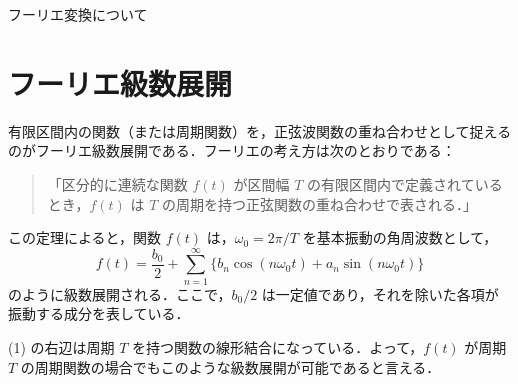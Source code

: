 \documentclass[a4paper,10pt]{article}
\begin{document}
\setcounter{page}{2}
\begin{center}{\LARGE\sffamily フーリエ変換について}\end{center}
\vspace{9pt}
\section{フーリエ級数展開}
有限区間内の関数（または周期関数）を，正弦波関数の重ね合わせとして捉えるのがフーリエ級数展開である．フーリエの考え方は次のとおりである：
\begin{quote}
「区分的に連続な関数 $f(t)$ が区間幅 $T$ の有限区間内で定義されているとき，$f(t)$ は $T$ の周期を持つ正弦関数の重ね合わせで表される．」
\end{quote}
\noindent この定理によると，関数 $f(t)$ は，$\omega_0=2\pi/T$ を基本振動の角周波数として，
\begin{equation}
f(t)=\frac{b_0}{2}+\sum_{n=1}^{\infty}\{b_n\cos(n\omega_0t)+a_n\sin(n\omega_0t)\}
\end{equation}
\noindent のように級数展開される．ここで，$b_0/2$ は一定値であり，それを除いた各項が振動する成分を表している．

(1) の右辺は周期 $T$ を持つ関数の線形結合になっている．よって，$f(t)$ が周期 $T$ の周期関数の場合でもこのような級数展開が可能であると言える．
\end{document}
